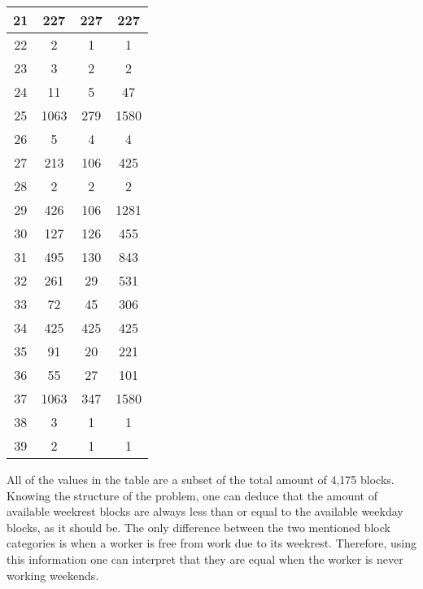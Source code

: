 \begin{table}[!h]
\begin{tabular}{|c|ccc|}
21     & 227     & 227      & 227     \\ \hline
22     & 2       & 1        & 1       \\ \hline
23     & 3       & 2        & 2       \\ \hline
24     & 11      & 5        & 47      \\ \hline
25     & 1063    & 279      & 1580    \\ \hline
26     & 5       & 4        & 4       \\ \hline
27     & 213     & 106      & 425     \\ \hline
28     & 2       & 2        & 2       \\ \hline
29     & 426     & 106      & 1281    \\ \hline
30     & 127     & 126      & 455     \\ \hline
31     & 495     & 130      & 843     \\ \hline
32     & 261     & 29       & 531     \\ \hline
33     & 72      & 45       & 306     \\ \hline
34     & 425     & 425      & 425     \\ \hline
35     & 91      & 20       & 221     \\ \hline
36     & 55      & 27       & 101     \\ \hline
37     & 1063    & 347      & 1580    \\ \hline
38     & 3       & 1        & 1       \\ \hline
39     & 2       & 1        & 1       \\ \hline
\end{tabular}
\end{table}

All of the values in the table are a subset of the total amount of 4,175 blocks. Knowing the structure of the problem, one can deduce that the amount of available weekrest blocks are always less than or equal to the available weekday blocks, as it should be. The only difference between the two mentioned block categories is when a worker is free from work due to its weekrest. Therefore, using this information one can interpret that they are equal when the worker is never working weekends.


